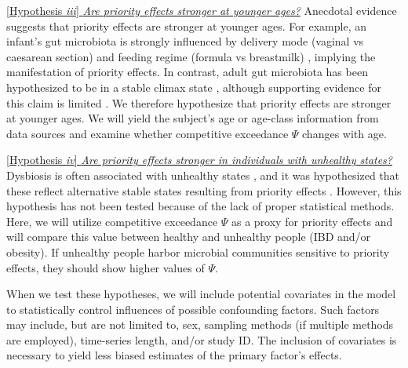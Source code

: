 \documentclass[12pt, class=article, crop=false]{standalone}
\begin{document}
\ul{[Hypothesis \textit{iii}] \textit{Are priority effects stronger at younger ages?}}
Anecdotal evidence suggests that priority effects are stronger at younger ages.
For example, an infant's gut microbiota is strongly influenced by delivery mode (vaginal vs caesarean section) and feeding regime (formula vs breastmilk) \citep{bokulich_antibiotics_2016, akagawa_effect_2019, dominguez-bello_delivery_2010}, implying the manifestation of priority effects.
In contrast, adult gut microbiota has been hypothesized to be in a stable climax state \citep{fierer_animalcules_2012, costello_application_2012}, although supporting evidence for this claim is limited \citep{fierer_animalcules_2012}.
We therefore hypothesize that priority effects are stronger at younger ages.
We will yield the subject's age or age-class information from data sources and examine whether competitive exceedance $\Psi$ changes with age.

\ul{[Hypothesis \textit{iv}] \textit{Are priority effects stronger in individuals with unhealthy states?}}
Dysbiosis is often associated with unhealthy states \citep{petersen_defining_2014, fierer_animalcules_2012}, and it was hypothesized that these reflect alternative stable states resulting from priority effects \citep{fierer_animalcules_2012}.
However, this hypothesis has not been tested because of the lack of proper statistical methods.
Here, we will utilize competitive exceedance $\Psi$ as a proxy for priority effects and will compare this value between healthy and unhealthy people (IBD and/or obesity).
If unhealthy people harbor microbial communities sensitive to priority effects, they should show higher values of $\Psi$.

When we test these hypotheses, we will include potential covariates in the model to statistically control influences of possible confounding factors.
Such factors may include, but are not limited to, sex, sampling methods (if multiple methods are employed), time-series length, and/or study ID.
The inclusion of covariates is necessary to yield less biased estimates of the primary factor's effects.
\end{document}

